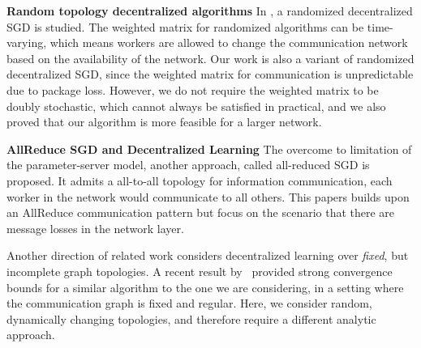 \documentclass{article}
\renewcommand{\paragraph}[1]{\noindent\textbf{#1}}
\newcounter{thm_counter}
\begin{document}
\paragraph{Random topology decentralized algorithms} In \cite{boyd2006randomized}, a randomized decentralized SGD is studied. The weighted matrix for randomized algorithms can be time-varying, which means workers are allowed to change the communication network based on the availability of the network. Our work is also a variant of randomized decentralized SGD, since the weighted matrix for communication is unpredictable due to package loss. However, we do not require the weighted matrix to be doubly stochastic, which cannot always be satisfied in practical, and we also proved that our algorithm is more feasible for a larger network. 


\paragraph{AllReduce SGD and Decentralized Learning} The overcome to limitation of the parameter-server model, another approach, called all-reduced SGD is proposed\cite{iandola2016firecaffe}. It admits a all-to-all topology for information communication, each worker in the network would communicate to all others\cite{tang2018d}. This papers builds upon an 
AllReduce communication pattern but focus on the scenario that
there are message losses in the network layer.

Another direction of related work considers decentralized learning over \emph{fixed}, but incomplete graph topologies. A recent result by~\cite{lian2017can} provided strong convergence bounds for a similar algorithm to the one we are considering, in a setting where the communication graph is fixed and regular. Here, we consider random, dynamically changing topologies, and therefore require a different analytic approach. 
\end{document}
